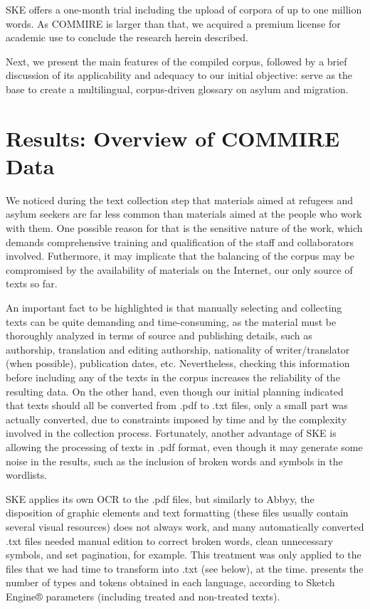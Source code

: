 \documentclass[english]{textolivre}
\begin{document}
SKE offers a one-month trial including the upload of corpora of up to one million words. As COMMIRE is larger than that, we acquired a premium license for academic use to conclude the research herein described.

Next, we present the main features of the compiled corpus, followed by a brief discussion of its applicability and adequacy to our initial objective: serve as the base to create a multilingual, corpus-driven glossary on asylum and migration.

\section{Results: Overview of COMMIRE Data}

We noticed during the text collection step that materials aimed at refugees and asylum seekers are far less common than materials aimed at the people who work with them. One possible reason for that is the sensitive nature of the work, which demands comprehensive training and qualification of the staff and collaborators involved. Futhermore, it may implicate that the balancing of the corpus may be compromised by the availability of materials on the Internet, our only source of texts so far.

An important fact to be highlighted is that manually selecting and collecting texts can be quite demanding and time-consuming, as the material must be thoroughly analyzed in terms of source and publishing details, such as authorship, translation and editing authorship, nationality of writer/translator (when possible), publication dates, etc. Nevertheless, checking this information before including any of the texts in the corpus increases the reliability of the resulting data. On the other hand, even though our initial planning indicated that texts should all be converted from .pdf to .txt files, only a small part was actually converted, due to constraints imposed by time and by the complexity involved in the collection process. Fortunately, another advantage of SKE is allowing the processing of texts in .pdf format, even though it may generate some noise in the results, such as the inclusion of broken words and symbols in the wordlists.

SKE applies its own OCR to the .pdf files, but similarly to Abbyy, the disposition of graphic elements and text formatting (these files usually contain several visual resources) does not always work, and many automatically converted .txt files needed manual edition to correct broken words, clean unnecessary symbols, and set pagination, for example. This treatment was only applied to the files that we had time to transform into .txt (see below), at the time.  presents the number of types and tokens obtained in each language, according to Sketch Engine® parameters (including treated and non-treated texts).
\end{document}
